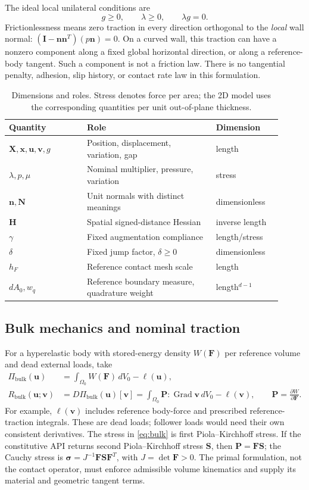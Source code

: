 \documentclass[preprint,11pt]{elsarticle}
\numberwithin{equation}{section}
\newcommand{\bu}{\boldsymbol{u}}
\newcommand{\bv}{\boldsymbol{v}}
\newcommand{\bx}{\boldsymbol{x}}
\newcommand{\bX}{\boldsymbol{X}}
\newcommand{\bn}{\boldsymbol{n}}
\newcommand{\bN}{\boldsymbol{N}}
\newcommand{\bH}{\boldsymbol{H}}
\newcommand{\bI}{\boldsymbol{I}}
\newcommand{\bP}{\boldsymbol{P}}
\newcommand{\bF}{\boldsymbol{F}}
\newcommand{\bS}{\boldsymbol{S}}
\newcommand{\Grad}{\operatorname{Grad}}
\newcommand{\Rbulk}{R_{\mathrm{bulk}}}
\newcommand{\Pibulk}{\Pi_{\mathrm{bulk}}}
\begin{document}
The ideal local unilateral conditions are
\begin{equation}
 g\geq0,\qquad \lambda\geq0,\qquad \lambda g=0.
 \label{eq:complementarity}
\end{equation}
Frictionlessness means zero traction in every direction orthogonal to the
\emph{local} wall normal: $(\bI-\bn\bn^T)(p\bn)=0$. On a curved wall,
this traction can have a nonzero component along a fixed global horizontal
direction, or along a reference-body tangent. Such a component is not a
friction law. There is no tangential penalty, adhesion, slip history, or
contact rate law in this formulation.

\begin{table}[htbp]
\centering
\caption{Dimensions and roles. Stress denotes force per area; the 2D model
uses the corresponding quantities per unit out-of-plane thickness.}
\label{tab:units}
\begin{tabular}{@{}p{0.26\linewidth}p{0.43\linewidth}p{0.22\linewidth}@{}}
\toprule
Quantity & Role & Dimension\\
\midrule
$\bX,\bx,\bu,\bv,g$ & Position, displacement, variation, gap & length\\
$\lambda,p,\mu$ & Nominal multiplier, pressure, variation & stress\\
$\bn,\bN$ & Unit normals with distinct meanings & dimensionless\\
$\bH$ & Spatial signed-distance Hessian & inverse length\\
$\gamma$ & Fixed augmentation compliance & length/stress\\
$\delta$ & Fixed jump factor, $\delta\geq0$ & dimensionless\\
$h_F$ & Reference contact mesh scale & length\\
$dA_0,w_q$ & Reference boundary measure, quadrature weight & length$^{d-1}$\\
\bottomrule
\end{tabular}
\end{table}

\subsection{Bulk mechanics and nominal traction}
For a hyperelastic body with stored-energy density $W(\bF)$ per reference
volume and dead external loads, take
\begin{align}
 \Pibulk(\bu)&=\int_{\Omega_0}W(\bF)\,dV_0-\ell(\bu),\\
 \Rbulk(\bu;\bv)&=D\Pibulk(\bu)[\bv]
 =\int_{\Omega_0}\bP:\Grad\bv\,dV_0-\ell(\bv),
 \qquad \bP=\frac{\partial W}{\partial\bF}.
 \label{eq:bulk}
\end{align}
For example, $\ell(\bv)$ includes reference body-force and prescribed
reference-traction integrals. These are dead loads; follower loads would
need their own consistent derivatives. The stress in
\eqref{eq:bulk} is first Piola--Kirchhoff stress. If the constitutive API
returns second Piola--Kirchhoff stress $\bS$, then $\bP=\bF\bS$;
the Cauchy stress is $\boldsymbol{\sigma}=J^{-1}\bF\bS\bF^T$, with
$J=\det\bF>0$. The primal formulation, not the contact operator, must
enforce admissible volume kinematics and supply its material and geometric
tangent terms.
\end{document}

